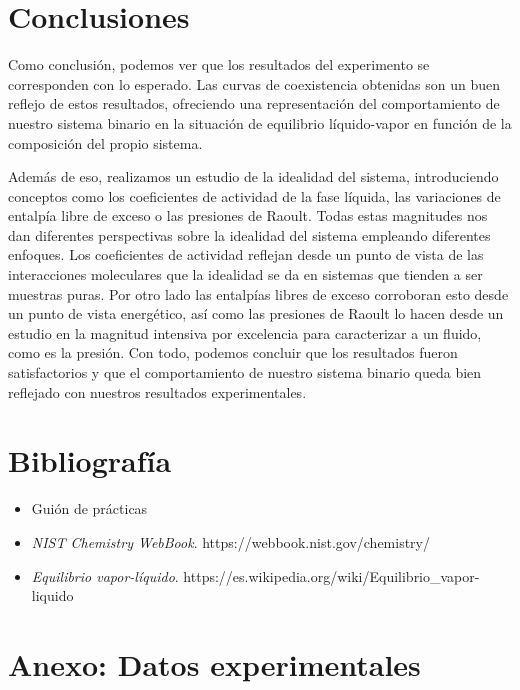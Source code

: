 \documentclass[a4paper,12pt,titlepage]{article}
\begin{document}
\section{Conclusiones}

Como conclusión, podemos ver que los resultados del experimento se corresponden con lo esperado. Las curvas de coexistencia obtenidas son un buen reflejo de estos resultados, ofreciendo una representación del comportamiento de nuestro sistema binario en la situación de equilibrio líquido-vapor en función de la composición del propio sistema.

Además de eso, realizamos un estudio de la idealidad del sistema, introduciendo conceptos como los coeficientes de actividad de la fase líquida, las variaciones de entalpía libre de exceso o las presiones de Raoult. Todas estas magnitudes nos dan diferentes perspectivas sobre la idealidad del sistema empleando diferentes enfoques. Los coeficientes de actividad reflejan desde un punto de vista de las interacciones moleculares que la idealidad se da en sistemas que tienden a ser muestras puras. Por otro lado las entalpías libres de exceso corroboran esto desde un punto de vista energético, así como las presiones de Raoult lo hacen desde un estudio en la magnitud intensiva por excelencia para caracterizar a un fluido, como es la presión. Con todo, podemos concluir que los resultados fueron satisfactorios y que el comportamiento de nuestro sistema binario queda bien reflejado con nuestros resultados experimentales.

\section{Bibliografía}

\begin{itemize}
    \item Guión de prácticas
    \item \textit{NIST Chemistry WebBook}. https://webbook.nist.gov/chemistry/
    \item \textit{Equilibrio vapor-líquido}. https://es.wikipedia.org/wiki/Equilibrio\_vapor-liquido
\end{itemize}

\newpage

\section{Anexo: Datos experimentales}
\end{document}
